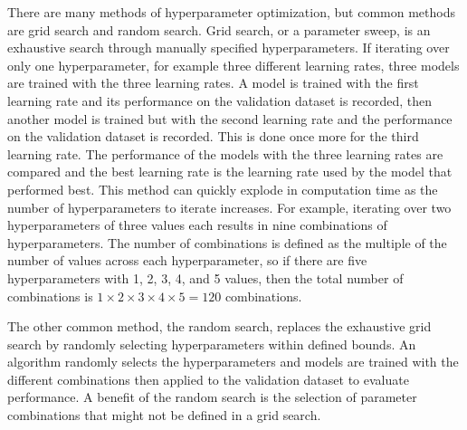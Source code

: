 There are many methods of hyperparameter optimization, but common methods are grid search and random search. Grid search, or a parameter sweep, is an exhaustive search through manually specified hyperparameters. If iterating over only one hyperparameter, for example three different learning rates, three models are trained with the three learning rates. A model is trained with the first learning rate and its performance on the validation dataset is recorded, then another model is trained but with the second learning rate and the performance on the validation dataset is recorded. This is done once more for the third learning rate. The performance of the models with the three learning rates are compared and the best learning rate is the learning rate used by the model that performed best. This method can quickly explode in computation time as the number of hyperparameters to iterate increases. For example, iterating over two hyperparameters of three values each results in nine combinations of hyperparameters. The number of combinations is defined as the multiple of the number of values across each hyperparameter, so if there are five hyperparameters with 1, 2, 3, 4, and 5 values, then the total number of combinations is $1 \times 2 \times 3 \times 4 \times 5 = 120$ combinations.

The other common method, the random search, replaces the exhaustive grid search by randomly selecting hyperparameters within defined bounds. An algorithm randomly selects the hyperparameters and models are trained with the different combinations then applied to the validation dataset to evaluate performance. A benefit of the random search is the selection of parameter combinations that might not be defined in a grid search.

